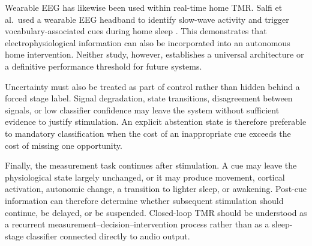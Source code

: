 Wearable EEG has likewise been used within real-time home TMR. Salfi et al.\
used a wearable EEG headband to identify slow-wave activity and trigger
vocabulary-associated cues during home sleep
\citep{salfi2025promoting}. This demonstrates that electrophysiological
information can also be incorporated into an autonomous home intervention.
Neither study, however, establishes a universal architecture or a definitive
performance threshold for future systems.

Uncertainty must also be treated as part of control rather than hidden behind
a forced stage label. Signal degradation, state transitions, disagreement
between signals, or low classifier confidence may leave the system without
sufficient evidence to justify stimulation. An explicit abstention state is
therefore preferable to mandatory classification when the cost of an
inappropriate cue exceeds the cost of missing one opportunity.

Finally, the measurement task continues after stimulation. A cue may leave the
physiological state largely unchanged, or it may produce movement, cortical
activation, autonomic change, a transition to lighter sleep, or awakening.
Post-cue information can therefore determine whether subsequent stimulation
should continue, be delayed, or be suspended. Closed-loop TMR should be
understood as a recurrent measurement--decision--intervention process rather
than as a sleep-stage classifier connected directly to audio output.


